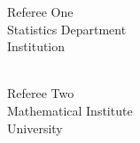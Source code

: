 \documentclass{wgu-cv}
\begin{document}
\begin{multicols}{2}

\begin{minipage}{\linewidth}
  Referee One \\
  Statistics Department \\
  Institution \\
   \\
\end{minipage}

\begin{minipage}{\linewidth}
  Referee Two \\
  Mathematical Institute \\
  University \\
\end{minipage}


\end{multicols}


\end{document}
